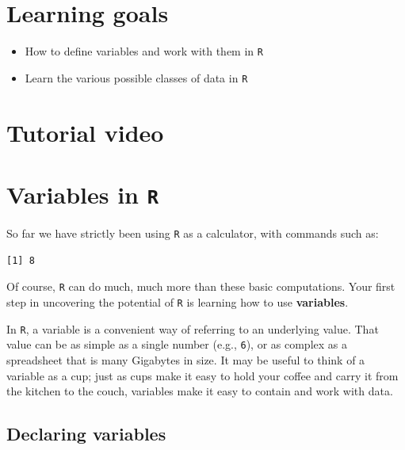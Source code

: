 \documentclass[
]{book}
\providecommand{\tightlist}{%
  \setlength{\itemsep}{0pt}\setlength{\parskip}{0pt}}
\begin{document}
\hypertarget{learning-goals-2}{%
\section*{Learning goals}\label{learning-goals-2}}

\begin{itemize}
\tightlist
\item
  How to define variables and work with them in \texttt{R}\\
\item
  Learn the various possible classes of data in \texttt{R}
\end{itemize}

\hypertarget{tutorial-video-2}{%
\section*{Tutorial video}\label{tutorial-video-2}}

\hypertarget{variables-in-r-1}{%
\section*{\texorpdfstring{Variables in \texttt{R}}{Variables in R}}\label{variables-in-r-1}}

So far we have strictly been using \texttt{R} as a calculator, with commands such as:

\begin{verbatim}
[1] 8
\end{verbatim}

Of course, \texttt{R} can do much, much more than these basic computations. Your first step in uncovering the potential of \texttt{R} is learning how to use \textbf{variables}.

In \texttt{R}, a variable is a convenient way of referring to an underlying value. That value can be as simple as a single number (e.g., \texttt{6}), or as complex as a spreadsheet that is many Gigabytes in size. It may be useful to think of a variable as a cup; just as cups make it easy to hold your coffee and carry it from the kitchen to the couch, variables make it easy to contain and work with data.

\hypertarget{declaring-variables}{%
\subsection*{Declaring variables}\label{declaring-variables}}
\end{document}
